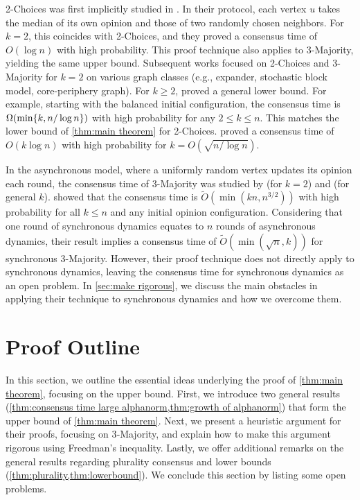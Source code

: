 \documentclass[letterpaper,11pt]{article}
\newcommand{\Otilde}{\widetilde{O}}
\begin{document}
2-Choices was first implicitly studied in \cite{Doerr11}.
In their protocol, each vertex $u$ takes the median of its own opinion and those of two randomly chosen neighbors. For $k=2$, this coincides with 2-Choices, and they proved a consensus time of $O(\log n)$ with high probability. This proof technique also applies to 3-Majority, yielding the same upper bound.
Subsequent works \cite{twochoice_ICALP14,twochoice_expander_DISC15,twochoice_expander_DISC17,CNS19,SS19,quasi-majority,CNN+18} focused on 2-Choices and 3-Majority for $k=2$ on various graph classes (e.g., expander, stochastic block model, core-periphery graph).
For $k\ge2$, \citet{ignore_or_comply} proved a general lower bound.
For example, starting with the balanced initial configuration, the consensus time is $\Omega\qty(\min\{k,n/\log n\})$ with high probability for any $2 \le k\le n$.
This matches the lower bound of \cref{thm:main theorem} for 2-Choices.
\citet{nearly_tight_analysis} proved a consensus time of $O(k\log n)$ with high probability for $k=O(\sqrt{n/\log n})$.

In the asynchronous model, where a uniformly random vertex updates its opinion each round, the consensus time of 3-Majority was studied by \citet{hierarchy_Berenbrink} (for $k=2$) and \citet{async_3-majority_soda25} (for general $k$).
\citet{async_3-majority_soda25} showed that the consensus time is $\Otilde(\min(kn,n^{3/2}))$ with high probability for all $k\le n$ and any initial opinion configuration.
Considering that one round of synchronous dynamics equates to $n$ rounds of asynchronous dynamics, their result implies a consensus time of $\Otilde(\min(\sqrt{n},k))$ for synchronous 3-Majority.
However, their proof technique does not directly apply to synchronous dynamics, leaving the consensus time for synchronous dynamics as an open problem.
In \cref{sec:make rigorous}, we discuss the main obstacles in applying their technique to synchronous dynamics and how we overcome them.
\section{Proof Outline} \label{sec:proof_outline}
In this section, we outline the essential ideas underlying the proof of \cref{thm:main theorem}, focusing on the upper bound. 
First, we introduce two general results (\cref{thm:consensus time large alphanorm,thm:growth of alphanorm}) that form the upper bound of \cref{thm:main theorem}. 
Next, we present a heuristic argument for their proofs, focusing on 3‑Majority, and explain how to make this argument rigorous using Freedman's inequality. 
Lastly, we offer additional remarks on the general results regarding plurality consensus and lower bounds (\cref{thm:plurality,thm:lowerbound}). 
We conclude this section by listing some open problems.
\end{document}
